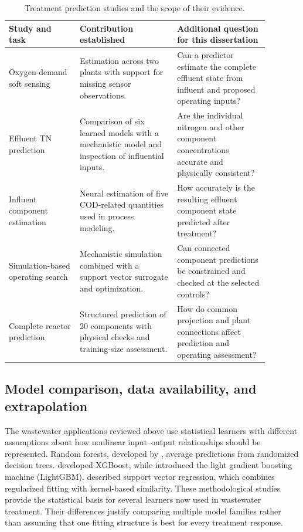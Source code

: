 \begin{table}[htbp]
\centering\footnotesize
\caption{Treatment prediction studies and the scope of their evidence.}
\label{tab:rrl_prediction_evidence}
\begin{tabular}{>{\raggedright\arraybackslash}p{0.24\linewidth}>{\raggedright\arraybackslash}p{0.33\linewidth}>{\raggedright\arraybackslash}p{0.31\linewidth}}
\toprule Study and task & Contribution established & Additional question for this dissertation\\\midrule
\citet{Ching2022}\newline Oxygen-demand soft sensing & Estimation across two plants with support for missing sensor observations. & Can a predictor estimate the complete effluent state from influent and proposed operating inputs?\\
\citet{Wang2025}\newline Effluent TN prediction & Comparison of six learned models with a mechanistic model and inspection of influential inputs. & Are the individual nitrogen and other component concentrations accurate and physically consistent?\\
\citet{Wang2024}\newline Influent component estimation & Neural estimation of five COD-related quantities used in process modeling. & How accurately is the resulting effluent component state predicted after treatment?\\
\citet{Fang2011}\newline Simulation-based operating search & Mechanistic simulation combined with a support vector surrogate and optimization. & Can connected component predictions be constrained and checked at the selected controls?\\
\citet{Selerio2026}\newline Complete reactor prediction & Structured prediction of 20 components with physical checks and training-size assessment. & How do common projection and plant connections affect prediction and operating assessment?\\
\bottomrule
\end{tabular}
\end{table}

\subsection{Model comparison, data availability, and extrapolation}

The wastewater applications reviewed above use statistical learners with different assumptions about how nonlinear input--output relationships should be represented. Random forests, developed by \citet{Breiman2001}, average predictions from randomized decision trees. \citet{ChenGuestrin2016} developed XGBoost, while \citet{Ke2017} introduced the light gradient boosting machine (LightGBM). \citet{SmolaScholkopf2004} described support vector regression, which combines regularized fitting with kernel-based similarity. These methodological studies provide the statistical basis for several learners now used in wastewater treatment. Their differences justify comparing multiple model families rather than assuming that one fitting structure is best for every treatment response.

